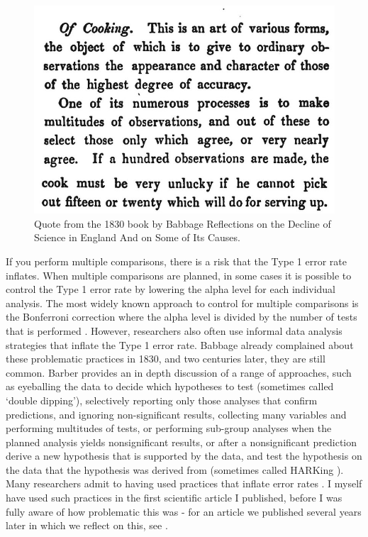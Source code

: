 \documentclass[
  oneside]{krantz}
\begin{document}
\begin{figure}

{\centering \includegraphics[width=1\linewidth]{images/babbagecooking} 

}

\caption{Quote from the 1830 book by Babbage Reflections on the Decline of Science in England And on Some of Its Causes.}\label{fig:cooking}
\end{figure}

If you perform multiple comparisons, there is a risk that the Type 1 error rate inflates. When multiple comparisons are planned, in some cases it is possible to control the Type 1 error rate by lowering the alpha level for each individual analysis. The most widely known approach to control for multiple comparisons is the Bonferroni correction where the alpha level is divided by the number of tests that is performed \citep{dunn_multiple_1961}. However, researchers also often use informal data analysis strategies that inflate the Type 1 error rate. Babbage \citeyearpar{babbage_reflections_1830} already complained about these problematic practices in 1830, and two centuries later, they are still common. Barber \citeyearpar{barber_pitfalls_1976} provides an in depth discussion of a range of approaches, such as eyeballing the data to decide which hypotheses to test (sometimes called `double dipping'), selectively reporting only those analyses that confirm predictions, and ignoring non-significant results, collecting many variables and performing multitudes of tests, or performing sub-group analyses when the planned analysis yields nonsignificant results, or after a nonsignificant prediction derive a new hypothesis that is supported by the data, and test the hypothesis on the data that the hypothesis was derived from (sometimes called HARKing \citep{kerr_harking_1998}). Many researchers admit to having used practices that inflate error rates \citep{fiedler_questionable_2015, john_measuring_2012, van_de_schoot_use_2021, chin_questionable_2021, makel_both_2021}. I myself have used such practices in the first scientific article I published, before I was fully aware of how problematic this was - for an article we published several years later in which we reflect on this, see \citet{jostmann_short_2016}.
\end{document}
